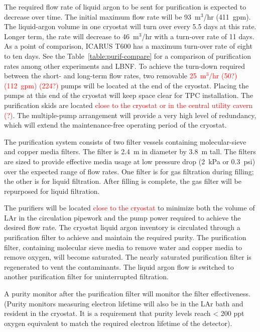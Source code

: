 The required flow rate of liquid argon to be sent for purification 
is expected to decrease over time. The initial maximum flow rate 
will be 93~m$^3$/hr (411~gpm). The liquid-argon volume in one 
cryostat will turn over every 5.5 days at this rate. 
Longer term, the rate will decrease to 46~m$^3$/hr 
with a turn-over rate of 11 days.  As a point of comparison, ICARUS 
T600 has a maximum turn-over rate of eight to ten days. See the 
Table~\ref{table:purif-compare} for a comparison of purification 
rates among other experiments and LBNF. To 
achieve the turn-down required between the short- and long-term flow rates, 
two removable \textcolor{red}{25~m$^3$/hr (50?) (112~gpm) (224?)} pumps 
will be located at the end of the cryostat. Placing the pumps at this 
end of the cryostat will keep space clear for TPC installation. The 
purification skids are located \textcolor{red}{close to the cryostat 
or in the central utility cavern (?)}.  
The multiple-pump arrangement will provide a very 
high level of redundancy, which will extend the maintenance-free 
operating period of the cryostat.  


The purification system consists of two filter vessels containing molecular-sieve and copper media filters. The filter is 2.4~m in diameter by 3.8~m tall. The filters are sized to provide effective media usage at low pressure drop (2~kPa or 0.3~psi) over the expected range of flow rates. 
One filter is for gas filtration during filling; the other is for liquid filtration. After filling is complete, the gas filter will be repurposed for liquid filtration.

The purifiers will be located \textcolor{red}{close to the cryostat} 
to minimize both the volume of LAr in the circulation pipework 
and the pump power required to achieve the desired flow rate.  
The cryostat liquid argon inventory is circulated through a purification filter to achieve and maintain the required purity. The purification filter, containing molecular sieve media to remove water and copper media to remove oxygen, will become saturated.
The nearly saturated purification filter is regenerated to vent the contaminants. The liquid argon flow is switched to another purification filter for uninterrupted filtration. 

A purity monitor after the purification filter will monitor the filter effectiveness. (Purity monitors measuring electron lifetime will also be in the LAr bath and resident in the cryostat.  It is a requirement that purity levels reach < 200 ppt oxygen equivalent to match the required electron lifetime of the detector). 

